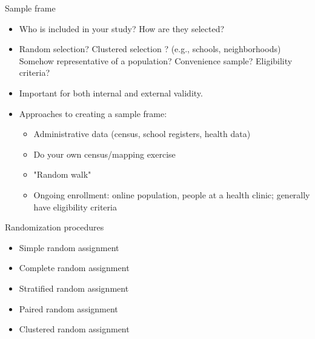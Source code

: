 \documentclass[xcolor={dvipsnames},handout]{beamer}
\begin{document}

\begin{frame}{Sample frame}

\begin{itemize}
\item Who is included in your study? How are they selected?
\item Random selection?  Clustered selection ? (e.g., schools, neighborhoods)  Somehow representative of a population?  Convenience sample?  Eligibility criteria?
\item Important for both internal and external validity.
\item Approaches to creating a sample frame:
\begin{itemize}
\item Administrative data (census, school registers, health data)
\item Do your own census/mapping exercise
\item "Random walk"
\item Ongoing enrollment: online population, people at a health clinic;  generally have eligibility criteria
\end{itemize}
\end{itemize}

\end{frame}




\begin{frame}{Randomization procedures}

\begin{itemize}
\item Simple random assignment
\item Complete random assignment
\item Stratified random assignment
\item Paired random assignment
\item Clustered random assignment
\end{itemize}

\end{frame}
\end{document}
